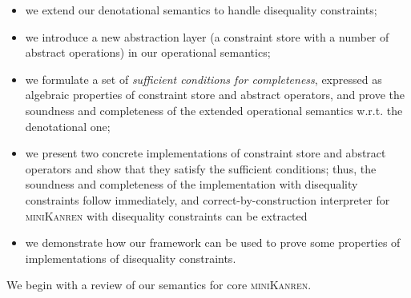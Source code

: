 \begin{itemize}
\item we extend our denotational semantics to handle disequality constraints;
\item we introduce a new abstraction layer (a constraint store with a number of abstract operations) in our operational semantics;
\item we formulate a set of \emph{sufficient conditions for completeness}, expressed as algebraic properties of constraint store and
  abstract operators, and prove the soundness and completeness of the extended operational semantics w.r.t. the denotational one;
\item we present two concrete implementations of constraint store and abstract operators and show that they satisfy the
  sufficient conditions; thus, the soundness and completeness of the implementation with disequality constraints follow
  immediately, and correct-by-construction interpreter for \textsc{miniKanren} with disequality constraints
  can be extracted
\item we demonstrate how our framework can be used to prove some properties of implementations of disequality constraints.
\end{itemize}

We begin with a review of our semantics for core \textsc{miniKanren}.